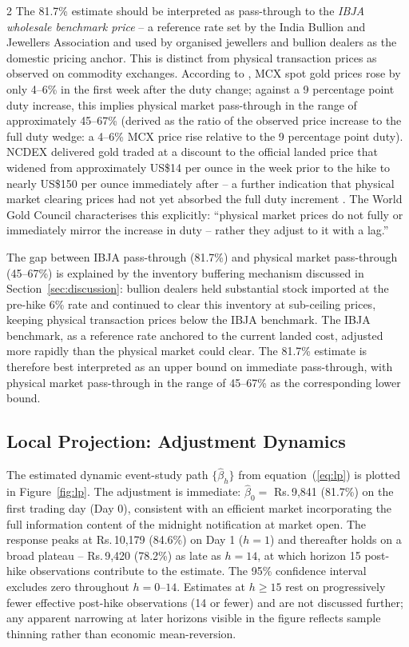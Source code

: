 \documentclass[12pt]{article}
\begin{document}
\begin{multicols}{2}
The 81.7\% estimate should be interpreted as pass-through to the \emph{IBJA wholesale benchmark price} -- a reference rate set by the India Bullion and Jewellers Association and used by organised jewellers and bullion dealers as the domestic pricing anchor. This is distinct from physical transaction prices as observed on commodity exchanges. According to \citet{WGC2026May}, MCX spot gold prices rose by only 4--6\% in the first week after the duty change; against a 9 percentage point duty increase, this implies physical market pass-through in the range of approximately 45--67\% (derived as the ratio of the observed price increase to the full duty wedge: a 4--6\% MCX price rise relative to the 9 percentage point duty). NCDEX delivered gold traded at a discount to the official landed price that widened from approximately US\$14 per ounce in the week prior to the hike to nearly US\$150 per ounce immediately after -- a further indication that physical market clearing prices had not yet absorbed the full duty increment \citep{WGC2026May}. The World Gold Council characterises this explicitly: ``physical market prices do not fully or immediately mirror the increase in duty -- rather they adjust to it with a lag.''

The gap between IBJA pass-through (81.7\%) and physical market pass-through (45--67\%) is explained by the inventory buffering mechanism discussed in Section~\ref{sec:discussion}: bullion dealers held substantial stock imported at the pre-hike 6\% rate and continued to clear this inventory at sub-ceiling prices, keeping physical transaction prices below the IBJA benchmark. The IBJA benchmark, as a reference rate anchored to the current landed cost, adjusted more rapidly than the physical market could clear. The 81.7\% estimate is therefore best interpreted as an upper bound on immediate pass-through, with physical market pass-through in the range of 45--67\% as the corresponding lower bound.

\subsection*{Local Projection: Adjustment Dynamics}

The estimated dynamic event-study path $\{\hat{\beta}_h\}$ from equation~(\ref{eq:lp}) is plotted in Figure~\ref{fig:lp}. The adjustment is immediate: $\hat{\beta}_0 = $ Rs.\,9,841 (81.7\%) on the first trading day (Day 0), consistent with an efficient market incorporating the full information content of the midnight notification at market open. The response peaks at Rs.\,10,179 (84.6\%) on Day 1 ($h = 1$) and thereafter holds on a broad plateau -- Rs.\,9,420 (78.2\%) as late as $h = 14$, at which horizon 15 post-hike observations contribute to the estimate. The 95\% confidence interval excludes zero throughout $h = 0$--$14$. Estimates at $h \geq 15$ rest on progressively fewer effective post-hike observations (14 or fewer) and are not discussed further; any apparent narrowing at later horizons visible in the figure reflects sample thinning rather than economic mean-reversion.


\end{multicols}
\end{document}
